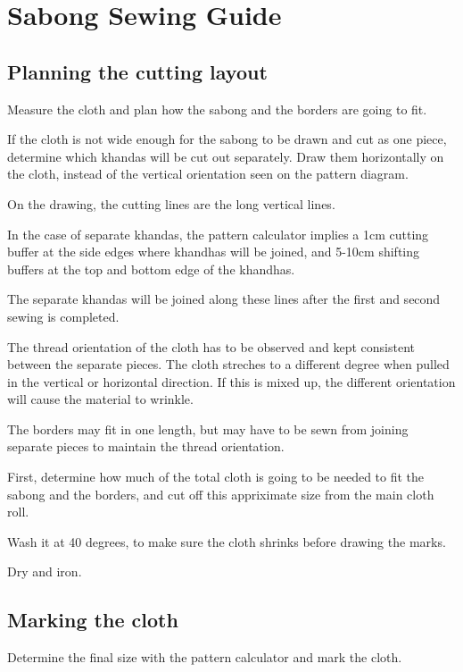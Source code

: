 \chapter{Sabong Sewing Guide}

\section{Planning the cutting layout}

Measure the cloth and plan how the sabong and the borders are going to
fit.

If the cloth is not wide enough for the sabong to be drawn and cut as
one piece, determine which khandas will be cut out separately. Draw them
horizontally on the cloth, instead of the vertical orientation seen on
the pattern diagram.

On the drawing, the cutting lines are the long vertical lines.

In the case of separate khandas, the pattern calculator implies a 1cm
cutting buffer at the side edges where khandhas will be joined, and
5-10cm shifting buffers at the top and bottom edge of the khandhas.

The separate khandas will be joined along these lines after the first
and second sewing is completed.

The thread orientation of the cloth has to be observed and kept
consistent between the separate pieces. The cloth streches to a
different degree when pulled in the vertical or horizontal direction. If
this is mixed up, the different orientation will cause the material to
wrinkle.

The borders may fit in one length, but may have to be sewn from joining
separate pieces to maintain the thread orientation.

First, determine how much of the total cloth is going to be needed to
fit the sabong and the borders, and cut off this appriximate size from
the main cloth roll.

Wash it at 40 degrees, to make sure the cloth shrinks before drawing the
marks.

Dry and iron.

\clearpage

\section{Marking the cloth}

Determine the final size with the pattern calculator and mark the cloth.

